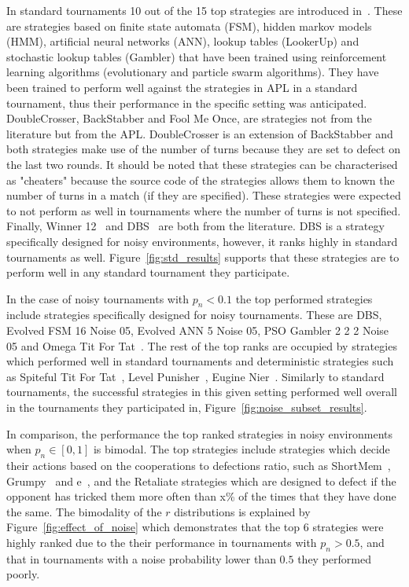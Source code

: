 \documentclass{article}
\begin{document}
In standard tournaments 10 out of the 15 top strategies are introduced
in~\cite{Harper2017}. These are strategies based on finite state automata (FSM),
hidden markov models (HMM), artificial neural networks (ANN), lookup tables
(LookerUp) and stochastic lookup tables (Gambler) that have been trained using
reinforcement learning algorithms (evolutionary and particle swarm algorithms).
They have been trained to perform well against the strategies
in APL in a standard tournament, thus their performance in the
specific setting was anticipated. DoubleCrosser, BackStabber and Fool Me Once, are
strategies not from the literature but from the APL. DoubleCrosser is an extension
of BackStabber and both strategies make use of the number of turns because they are
set to defect on the last two rounds. It should be noted that these
strategies can be characterised as "cheaters" because the source code of the strategies
allows them to known the number of turns in a match (if they are specified).
These strategies were expected to not perform as well in
tournaments where the number of turns is not specified. Finally, Winner
12~\cite{mathieu2017} and DBS~\cite{Au2006} are both from the literature.
DBS is a strategy specifically designed for noisy environments, however, it ranks
highly in standard tournaments as well.
Figure~\ref{fig:std_results} supports that these strategies are to perform
well in any standard tournament they participate.

In the case of noisy tournaments with \(p_n < 0.1\) the top performed strategies
include strategies specifically designed for noisy tournaments. These are DBS,
Evolved FSM 16 Noise 05, Evolved ANN 5 Noise 05, PSO Gambler 2 2 2 Noise 05 and
Omega Tit For Tat~\cite{kendall2007iterated}. The rest of the top ranks are
occupied by strategies which performed well in standard tournaments and
deterministic strategies such as Spiteful Tit For Tat~\cite{prison}, Level
Punisher~\cite{Eckhart2015}, Eugine Nier~\cite{lesswrong}. Similarly to standard
tournaments, the successful strategies in this given setting performed well
overall in the tournaments they participated in,
Figure~\ref{fig:noise_subset_results}.

In comparison, the performance the top ranked strategies in noisy environments
when \(p_n\in [0, 1]\) is bimodal. The top strategies include strategies which
decide their actions based on the cooperations to defections ratio, such as
ShortMem~\cite{Andre2013}, Grumpy~\cite{axelrodproject} and
e~\cite{axelrodproject}, and the Retaliate strategies which are designed to
defect if the opponent has tricked them more often than x\% of the times that
they have done the same. The bimodality of the \(r\) distributions is explained
by Figure~\ref{fig:effect_of_noise} which demonstrates that the top 6 strategies
were highly ranked due to the their performance in tournaments with \(p_n>0.5\),
and that in tournaments with a noise probability lower than \(0.5\) they
performed poorly.
\end{document}
